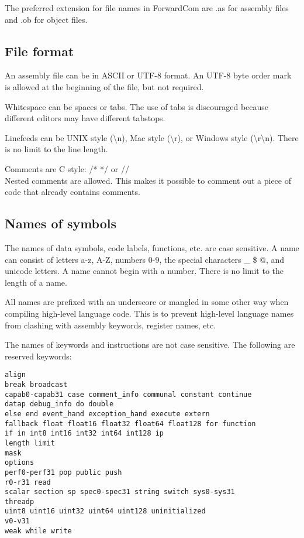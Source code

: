 \documentclass[forwardcom.tex]{subfiles}
\begin{document}
The preferred extension for file names in ForwardCom are .as for assembly files and .ob for object files.
\vspace{2mm}


\subsection{File format} \label{assemblyFileFormat}
An assembly file can be in ASCII or UTF-8 format. An UTF-8 byte order mark is allowed at the beginning of the file, but not required.
\vspace{2mm}

Whitespace can be spaces or tabs. The use of tabs is discouraged because different editors may have different tabstops.
\vspace{2mm}

Linefeeds can be UNIX style (\textbackslash n), Mac style (\textbackslash r), or Windows style (\textbackslash r\textbackslash n). There is no limit to the line length.
\vspace{2mm}

Comments are C style:  /* */ or // \\
Nested comments are allowed. This makes it possible to comment out a piece of code that already contains comments.
\vspace{2mm}


\subsection{Names of symbols} \label{assemblerNames}
The names of data symbols, code labels, functions, etc. are case sensitive. 
A name can consist of letters a-z, A-Z, numbers 0-9, the special characters \_ \$ @, 
and unicode letters. A name cannot begin with a number. There is no limit to the length of a name.
\vspace{2mm}

All names are prefixed with an underscore or mangled in some other way when compiling high-level language code. This is to prevent high-level language names from clashing with assembly keywords, register names, etc.
\vspace{2mm}

The names of keywords and instructions are not case sensitive.
The following are reserved keywords:
\begin{lstlisting}[frame=single]
align 
break broadcast
capab0-capab31 case comment_info communal constant continue
datap debug_info do double 
else end event_hand exception_hand execute extern 
fallback float float16 float32 float64 float128 for function 
if in int8 int16 int32 int64 int128 ip 
length limit
mask
options
perf0-perf31 pop public push
r0-r31 read
scalar section sp spec0-spec31 string switch sys0-sys31
threadp 
uint8 uint16 uint32 uint64 uint128 uninitialized
v0-v31 
weak while write
\end{lstlisting}
\vspace{2mm}
\end{document}
